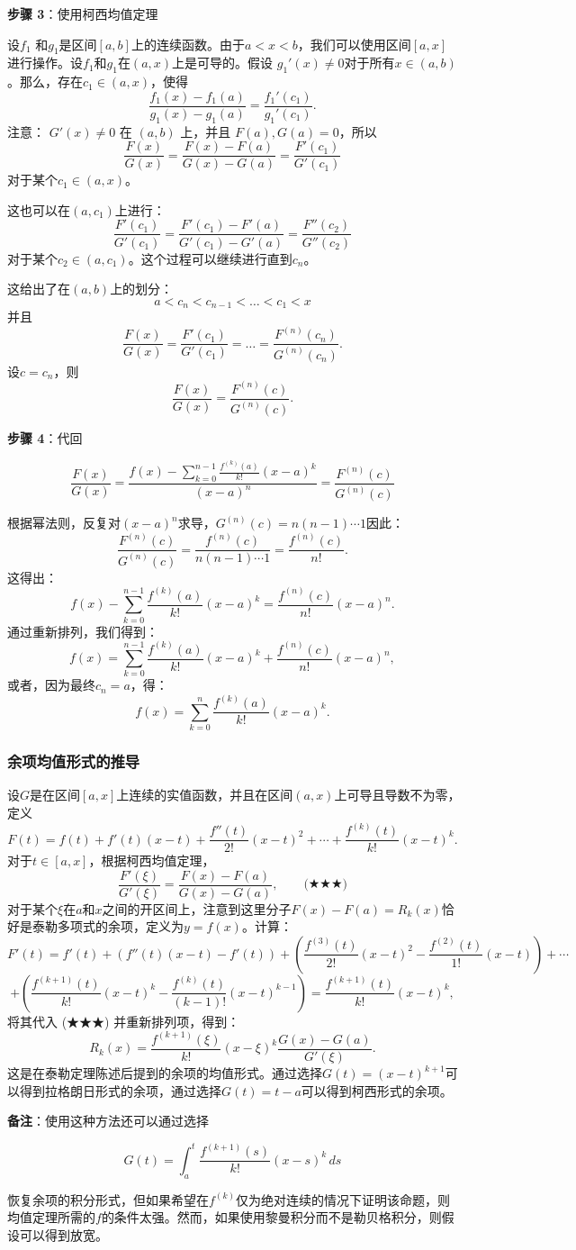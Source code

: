 \textbf{步骤 3}：使用柯西均值定理

设\( f_1 \) 和\( g_1 \)是区间\( [a, b] \)上的连续函数。由于\( a < x < b \)，我们可以使用区间\( [a, x] \) 进行操作。设\( f_1 \)和\( g_1 \)在\( (a, x) \)上是可导的。假设 \( g_1'(x) \neq 0 \)对于所有\( x \in (a, b) \)。那么，存在\( c_1 \in (a, x) \)，使得
\[
\frac{f_1(x) - f_1(a)}{g_1(x) - g_1(a)} = \frac{f_1'(c_1)}{g_1'(c_1)}.~
\]
注意： 
\( G'(x) \neq 0 \) 在 \( (a, b) \) 上，并且 \( F(a), G(a) = 0 \)，所以
\[
\frac{F(x)}{G(x)} = \frac{F(x) - F(a)}{G(x) - G(a)} = \frac{F'(c_1)}{G'(c_1)}~
\]
对于某个\( c_1 \in (a, x) \)。

这也可以在\( (a, c_1) \)上进行：
\[
\frac{F'(c_1)}{G'(c_1)} = \frac{F'(c_1) - F'(a)}{G'(c_1) - G'(a)} = \frac{F''(c_2)}{G''(c_2)}~
\]
对于某个\( c_2 \in (a, c_1) \)。这个过程可以继续进行直到\( c_n \)。

这给出了在\( (a, b) \)上的划分：
\[
a < c_n < c_{n-1} < \dots < c_1 < x~
\]
并且
\[
\frac{F(x)}{G(x)} = \frac{F'(c_1)}{G'(c_1)} = \dots = \frac{F^{(n)}(c_n)}{G^{(n)}(c_n)}.~
\]
设\( c = c_n \)，则
\[
\frac{F(x)}{G(x)} = \frac{F^{(n)}(c)}{G^{(n)}(c)}.~
\]

\textbf{步骤 4}：代回

\[
\frac{F(x)}{G(x)} = \frac{f(x) - \sum_{k=0}^{n-1} \frac{f^{(k)}(a)}{k!} (x - a)^k}{(x - a)^n} = \frac{F^{(n)}(c)}{G^{(n)}(c)}~
\]

根据幂法则，反复对\( (x - a)^n \)求导，\(G^{(n)}(c) = n(n - 1) \cdots 1\)因此：
\[
\frac{F^{(n)}(c)}{G^{(n)}(c)} = \frac{f^{(n)}(c)}{n(n - 1) \cdots 1} = \frac{f^{(n)}(c)}{n!}.~
\]
这得出：
\[
f(x) - \sum_{k=0}^{n-1} \frac{f^{(k)}(a)}{k!} (x - a)^k = \frac{f^{(n)}(c)}{n!} (x - a)^n.~
\]
通过重新排列，我们得到：
\[
f(x) = \sum_{k=0}^{n-1} \frac{f^{(k)}(a)}{k!} (x - a)^k + \frac{f^{(n)}(c)}{n!} (x - a)^n,~
\]
或者，因为最终\( c_n = a \)，得：
\[
f(x) = \sum_{k=0}^{n} \frac{f^{(k)}(a)}{k!} (x - a)^k.~
\]
\subsubsection{余项均值形式的推导}  
设\( G \)是在区间\( [a, x] \)上连续的实值函数，并且在区间\( (a, x) \)上可导且导数不为零，定义
\[
F(t) = f(t) + f'(t)(x - t) + \frac{f''(t)}{2!}(x - t)^2 + \cdots + \frac{f^{(k)}(t)}{k!}(x - t)^k.~
\]
对于\( t \in [a, x] \)，根据柯西均值定理，
\[
\frac{F'(\xi)}{G'(\xi)} = \frac{F(x) - F(a)}{G(x) - G(a)},\qquad \text{(★★★)}~
\]
对于某个\( \xi \)在\( a \)和\( x \)之间的开区间上，注意到这里分子\( F(x) - F(a) = R_k(x) \)恰好是泰勒多项式的余项，定义为\( y = f(x) \)。计算：
\[
F'(t) = f'(t) + \left( f''(t)(x - t) - f'(t) \right) + \left( \frac{f^{(3)}(t)}{2!} (x - t)^2 - \frac{f^{(2)}(t)}{1!} (x - t) \right) + \cdots ~
\]
\[
+ \left( \frac{f^{(k+1)}(t)}{k!} (x - t)^k - \frac{f^{(k)}(t)}{(k-1)!} (x - t)^{k-1} \right) = \frac{f^{(k+1)}(t)}{k!} (x - t)^k,~
\]
将其代入 (★★★) 并重新排列项，得到：
\[
R_k(x) = \frac{f^{(k+1)}(\xi)}{k!} (x - \xi)^k \frac{G(x) - G(a)}{G'(\xi)}.~
\]
这是在泰勒定理陈述后提到的余项的均值形式。通过选择\( G(t) = (x - t)^{k+1} \)可以得到拉格朗日形式的余项，通过选择\( G(t) = t - a \)可以得到柯西形式的余项。

\textbf{备注}：使用这种方法还可以通过选择

\[
G(t) = \int_a^t \frac{f^{(k+1)}(s)}{k!} (x - s)^k \, ds~
\]

恢复余项的积分形式，但如果希望在\( f^{(k)} \)仅为绝对连续的情况下证明该命题，则均值定理所需的\( f \)的条件太强。然而，如果使用黎曼积分而不是勒贝格积分，则假设可以得到放宽。